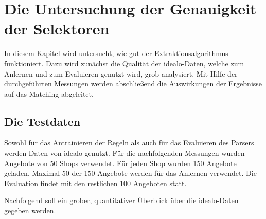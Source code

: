 \section{Die Untersuchung der Genauigkeit der Selektoren}
\label{sec:evaluierung}

In diesem Kapitel wird untersucht, wie gut der Extraktionsalgorithmus funktioniert.
Dazu wird zunächst die Qualität der idealo-Daten, welche zum Anlernen und zum Evaluieren genutzt wird, grob analysiert.
Mit Hilfe der durchgeführten Messungen werden abschließend die Auswirkungen der Ergebnisse auf das Matching abgeleitet.

\subsection{Die Testdaten}
\label{subsec:testdaten}

Sowohl für das Antrainieren der Regeln als auch für das Evaluieren des Parsers werden Daten von idealo genutzt.
Für die nachfolgenden Messungen wurden Angebote von 50 Shops verwendet.
Für jeden Shop wurden 150 Angebote geladen.
Maximal 50 der 150 Angebote werden für das Anlernen verwendet.
Die Evaluation findet mit den restlichen 100 Angeboten statt.

Nachfolgend soll ein grober, quantitativer Überblick über die idealo-Daten gegeben werden.

